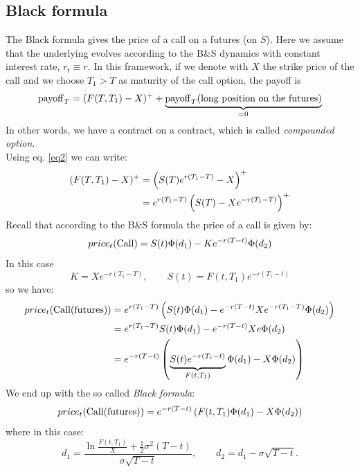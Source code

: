 \subsection{Black formula} %
The Black formula gives the price of a call on a futures (on $S$). Here we assume that the underlying evolves according to the B\&S dynamics with constant interest rate, $r_t \equiv r$. In this framework, if we denote with $X$ the strike price of the call and we choose $T_1 > T$ as maturity of the call option, the payoff is
\begin{equation}
    \operatorname{payoff}_T = (F(T,T_1) - X)^+ + \underbrace{\operatorname{payoff}_T(\text{long position on the futures})}_{=0}
\end{equation}
In other words, we have a contract on a contract, which is called \emph{compounded option}. \\
Using eq. \eqref{eq2} we can write:
\begin{align}
    \notag (F(T,T_1) - X)^+ &= \left(S(T)e^{r(T_1-T)} - X\right)^+ \\
    &=
    e^{r(T_1-T)}\left(S(T)-Xe^{-r(T_1-T)}\right)^+
\end{align}
Recall that according to the B\&S formula the price of a call is given by:
\begin{equation*}
    price_t(\operatorname{Call}) = S(t)\Phi(d_1)-Ke^{-r(T-t)}\Phi(d_2)
\end{equation*}
In this case
\begin{equation*}
    K = Xe^{-r(T_1-T)}, \qquad S(t) = F(t,T_1)e^{-r(T_1-t)}
\end{equation*}
so we have:
\begin{align*}
    price_t(\operatorname{Call}(\operatorname{futures})) &= e^{r(T_1-T)} \left(S(t)\Phi(d_1)-e^{-r(T-t)}Xe^{-r(T_1-T)}\Phi(d_2)\right) \\
    &=
    e^{r(T_1-T)}S(t)\Phi(d_1)-e^{-r(T-t)}Xe\Phi(d_2) \\
    &=
    e^{-r(T-t)}\left(\underbrace{S(t)e^{-r(T_1-t)}}_{F(t,T_1)}\Phi(d_1) - X\Phi(d_2)\right)
\end{align*}
We end up with the so called \emph{Black formula}:
\begin{equation}
    price_t(\operatorname{Call}(\operatorname{futures})) = e^{-r(T-t)}\left(F(t,T_1)\Phi(d_1) - X\Phi(d_2)\right)
\end{equation}
where in this case:
\begin{equation}
    d_1 = \dfrac{\ln\frac{F(t,T_1)}{X}+\frac{1}{2}\sigma^2(T-t)}{\sigma\sqrt{T-t}}, \qquad d_2 = d_1 - \sigma\sqrt{T-t}. %
\end{equation}
